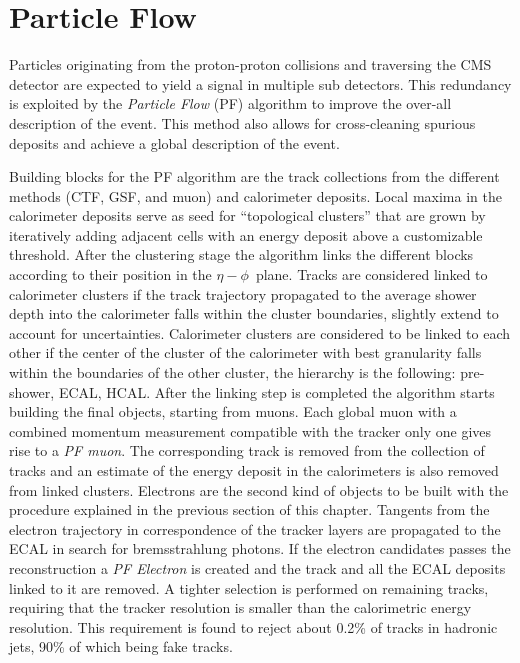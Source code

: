 \section{Particle Flow}


Particles originating from the proton-proton collisions and traversing the CMS detector are expected to yield a signal in multiple sub detectors. This redundancy is exploited by the \emph{Particle Flow} (PF) algorithm to improve the over-all description of the event. This method also allows for cross-cleaning spurious deposits and achieve a global description of the event.

Building blocks for the PF algorithm are the track collections from the different methods (CTF, GSF, and muon) and calorimeter deposits. Local maxima in the calorimeter deposits serve as seed for ``topological clusters'' that are grown by iteratively adding adjacent cells with an energy deposit above a customizable threshold. After the clustering stage the algorithm links the different blocks according to their position in the $\eta-\phi$\ plane. Tracks are considered linked to calorimeter clusters if the track trajectory propagated to the average shower depth into the calorimeter falls within the cluster boundaries, slightly extend to account for uncertainties. Calorimeter clusters are considered to be linked to each other if the center of the cluster of the calorimeter with best granularity falls within the boundaries of the other cluster, the hierarchy is the following: pre-shower, ECAL, HCAL. After the linking step is completed the algorithm starts building the final objects, starting from muons. Each global muon with a combined momentum measurement compatible with the tracker only one gives rise to a \emph{PF muon}. The corresponding track is removed from the collection of tracks and an estimate of the energy deposit in the calorimeters is also removed from linked clusters. Electrons are the second kind of objects to be built with the procedure explained in the previous section of this chapter. Tangents from the electron trajectory in correspondence of the tracker layers are propagated to the ECAL in search for bremsstrahlung photons. If the electron candidates passes the reconstruction a \emph{PF Electron} is created and the track and all the ECAL deposits linked to it are removed. A tighter selection is performed on remaining tracks, requiring that the tracker \pT resolution is smaller than the calorimetric energy resolution. This requirement is found to reject about 0.2\% of tracks in hadronic jets, 90\% of which being fake tracks. 
